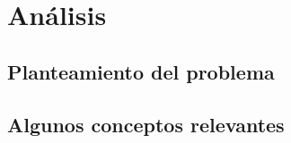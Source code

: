 \chapter{Análisis}
	\label{chap:four}
	
\section{Planteamiento del problema}

\section{Algunos conceptos relevantes}

